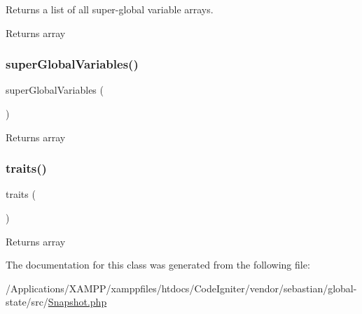 Returns a list of all super-\/global variable arrays.

\begin{DoxyReturn}{Returns}
array 
\end{DoxyReturn}
\mbox{\label{class_sebastian_bergmann_1_1_global_state_1_1_snapshot_a6aee689dcf4ff2ada1690926d9d62cde}} 
\subsubsection{\texorpdfstring{super\+Global\+Variables()}{superGlobalVariables()}}
{\footnotesize\ttfamily super\+Global\+Variables (\begin{DoxyParamCaption}{ }\end{DoxyParamCaption})}

\begin{DoxyReturn}{Returns}
array 
\end{DoxyReturn}
\mbox{\label{class_sebastian_bergmann_1_1_global_state_1_1_snapshot_a7c4ffaba1f26678ced320c5787c3d590}} 
\subsubsection{\texorpdfstring{traits()}{traits()}}
{\footnotesize\ttfamily traits (\begin{DoxyParamCaption}{ }\end{DoxyParamCaption})}

\begin{DoxyReturn}{Returns}
array 
\end{DoxyReturn}


The documentation for this class was generated from the following file\+:\begin{DoxyCompactItemize}
\item 
/\+Applications/\+X\+A\+M\+P\+P/xamppfiles/htdocs/\+Code\+Igniter/vendor/sebastian/global-\/state/src/\mbox{\hyperlink{_snapshot_8php}{Snapshot.\+php}}\end{DoxyCompactItemize}
